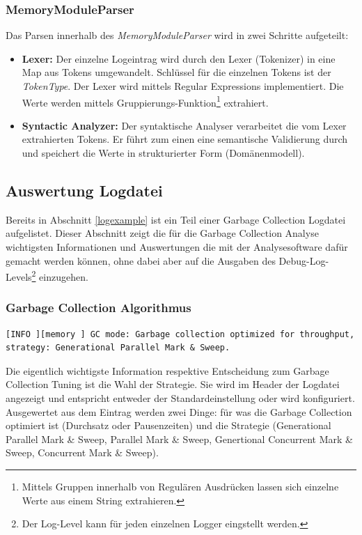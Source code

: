 \subsubsection{MemoryModuleParser}
Das Parsen innerhalb des \textit{MemoryModuleParser} wird in zwei Schritte aufgeteilt:
\begin{itemize}
\item \textbf{Lexer: }Der einzelne Logeintrag wird durch den Lexer (Tokenizer) in eine Map aus Tokens umgewandelt. Schlüssel für die einzelnen Tokens ist der \textit{TokenType}. Der Lexer wird mittels Regular Expressions implementiert. Die Werte werden mittels Gruppierungs-Funktion\footnote{Mittels Gruppen innerhalb von Regulären Ausdrücken lassen sich einzelne Werte aus einem String extrahieren.} extrahiert. 
\item \textbf{Syntactic Analyzer: }Der syntaktische Analyser verarbeitet die vom Lexer extrahierten Tokens. Er führt zum einen eine semantische Validierung durch und speichert die Werte in strukturierter Form (Domänenmodell).
\end{itemize}

\subsection{Auswertung Logdatei}
Bereits in Abschnitt \ref{logexample} ist ein Teil einer Garbage Collection Logdatei aufgelistet. Dieser Abschnitt zeigt die für die Garbage Collection Analyse wichtigsten Informationen und Auswertungen die mit der Analysesoftware dafür gemacht werden können, ohne dabei aber auf die Ausgaben des Debug-Log-Levels\footnote{Der Log-Level kann für jeden einzelnen Logger eingstellt werden.} einzugehen.

\subsubsection{Garbage Collection Algorithmus}
\begin{lstlisting}[numbers=none,  framexleftmargin=0mm, caption=Logdatei: Ausgabe initialer Garbage Collection Algorithmus]
[INFO ][memory ] GC mode: Garbage collection optimized for throughput, strategy: Generational Parallel Mark & Sweep.
\end{lstlisting}
Die eigentlich wichtigste Information respektive Entscheidung zum Garbage Collection Tuning ist die Wahl der Strategie. Sie wird im Header der Logdatei angezeigt und entspricht entweder der Standardeinstellung oder wird konfiguriert. Ausgewertet aus dem Eintrag werden zwei Dinge: für was die Garbage Collection optimiert ist (Durchsatz oder Pausenzeiten) und die Strategie (Generational Parallel Mark \& Sweep, Parallel Mark \& Sweep, Genertional Concurrent Mark \& Sweep, Concurrent Mark \& Sweep).
	
